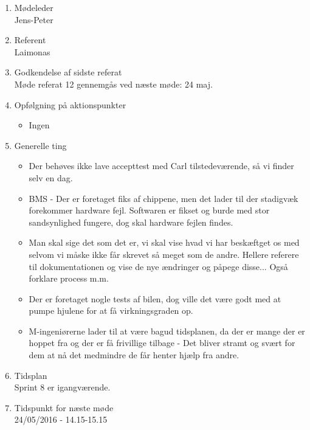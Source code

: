	\begin{enumerate}
		\itemsep 0.3em 
		\item Mødeleder\\
			Jens-Peter
		\item Referent\\
			Laimonas
		\item Godkendelse af sidste referat\\
			Møde referat 12 gennemgås ved næste møde: 24 maj. 

		\item Opfølgning på aktionspunkter
		\begin{itemize}
			\itemsep 0.3em 
			\item Ingen
		\end{itemize}
		
		\item Generelle ting
			\begin{itemize}
					
				\item Der behøves ikke lave accepttest med Carl tilstedeværende, så vi finder selv en dag.
				
				\item BMS - Der er foretaget fiks af chippene, men det lader til der stadigvæk forekommer hardware fejl. Softwaren er fikset og burde med stor sandsynlighed fungere, dog skal hardware fejlen findes. 
				
				\item Man skal sige det som det er, vi skal vise hvad vi har beskæftget os med selvom vi måske ikke får skrevet så meget som de andre. Hellere referere til dokumentationen og vise de nye ændringer og påpege disse... Også forklare process m.m.
				
				\item Der er foretaget nogle tests af bilen, dog ville det være godt med at pumpe hjulene for at få virkningsgraden op.
				
				\item M-ingeniørerne lader til at være bagud tidsplanen, da der er mange der er hoppet fra og der er få frivillige tilbage - Det bliver stramt og svært for dem at nå det medmindre de får henter hjælp fra andre. 
				
			\end{itemize}
		
		\item Tidsplan\\
			Sprint 8 er igangværende. 

		\item Tidspunkt for næste møde\\
			24/05/2016 - 14.15-15.15
	\end{enumerate}
